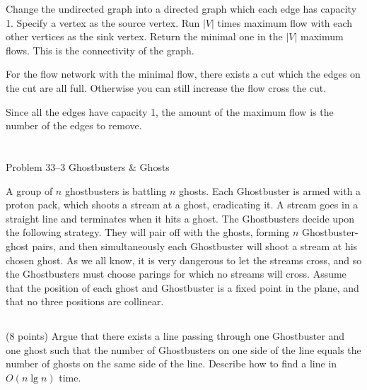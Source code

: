 \documentclass[paper=a4, fontsize=11pt]{scrartcl} %
\begin{document}
Change the undirected graph into a directed graph which each edge has
capacity 1.
Specify a vertex as the source vertex.
Run $|V|$ times maximum flow with each other vertices as the sink
vertex.
Return the minimal one in the $|V|$ maximum flows.
This is the connectivity of the graph.

For the flow network with the minimal flow, there exists a cut which
the edges on the cut are all full. Otherwise you can still increase
the flow cross the cut.

Since all the edges have capacity 1, the amount of the maximum flow is
the number of the edges to remove.

\pagebreak

\section{}

\begin{fancyquotes}
  Problem 33--3 Ghostbusters \& Ghosts

  A group of $n$ ghostbusters is battling $n$ ghosts. Each Ghostbuster
  is armed with a proton pack, which shoots a stream at a ghost,
  eradicating it. A stream goes in a straight line and terminates when
  it hits a ghost. The Ghostbusters decide upon the following
  strategy. They will pair off with the ghosts, forming $n$
  Ghostbuster-ghost pairs, and then simultaneously each Ghostbuster
  will shoot a stream at his chosen ghost. As we all know, it is very
  dangerous to let the streams cross, and so the Ghostbusters must
  choose parings for which no streams will cross. Assume that the
  position of each ghost and Ghostbuster is a fixed point in the
  plane, and that no three positions are collinear.
\end{fancyquotes}

\subsection{}
\label{sub:GGsame}

\begin{fancyquotes}
  (8 points) Argue that there exists a line passing through one
  Ghostbuster and one ghost such that the number of Ghostbusters on
  one side of the line equals the number of ghosts on the same side
  of the line. Describe how to find a line in $O(n\lg{n})$ time.
\end{fancyquotes}
\end{document}
